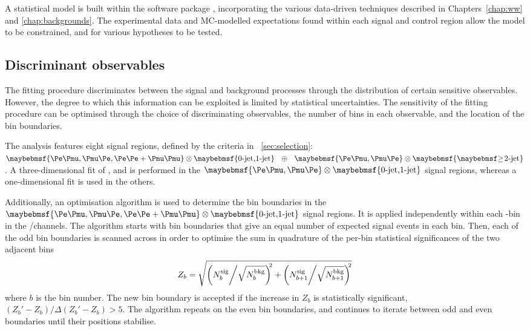
A statistical model is built within the \histfactory software package \cite{HistFactory}, 
incorporating the various data-driven techniques described in Chapters~\ref{chap:ww} and 
\ref{chap:backgrounds}. The experimental data and MC-modelled expectations found within each 
signal and control region allow the model to be constrained, and for various hypotheses to 
be tested.



\subsection{Discriminant observables}
\label{sec:stat:sr_binning}

The fitting procedure discriminates between the signal and background processes through the 
distribution of certain sensitive observables. However, the degree to which this information 
can be exploited is limited by statistical uncertainties. The sensitivity of the fitting 
procedure can be optimised through the choice of discriminating observables, the number of 
bins in each observable, and the location of the bin boundaries.

The analysis features eight signal regions, defined by the criteria in 
\Section~\ref{sec:selection}: $\braces{\emch,\mech,\eech{}+\mmch} \otimes 
\braces{\text{0-jet,1-jet}}~~\oplus~~\braces{\emch,\mech} \otimes \braces{\twojet}$.
A three-dimensional fit of \mt, \ptsubleadlep and \mll is performed in the 
$\braces{\emch,\mech} \otimes \braces{\text{0-jet,1-jet}}$ signal regions, whereas a 
one-dimensional \mt fit is used in the others.

Additionally, an optimisation algorithm is used to determine the \mt bin boundaries in the 
$\braces{\emch,\mech,\eech{}+\mmch} \otimes \braces{\text{0-jet,1-jet}}$ signal regions. 
It is applied independently within each \ptsubleadlep-\mll bin in the \emch/\mech channels. 
The algorithm starts with bin boundaries that give an equal number of expected signal 
events in each bin. Then, each of the odd bin boundaries is scanned across \mt in order to 
optimise the sum in quadrature of the per-bin statistical significances of the two adjacent 
bins
\begin{equation}
	Z_b = \sqrt{\left(N_{b}^{\text{sig}} \middle/ \sqrt{N_{b}^{\text{bkg}}}\right)^{\!\!2} + \left(N_{b+1}^{\text{sig}} \middle/ \sqrt{N_{b+1}^{\text{bkg}}}\right)^{\!\!2}}
\end{equation}
where $b$ is the bin number. The new bin boundary is accepted if the increase in $Z_b$ is 
statistically significant, \ie $(Z_b' - Z_b)/\Delta(Z_b' - Z_b) > 5$. The algorithm repeats 
on the even bin boundaries, and continues to iterate between odd and even boundaries until 
their positions stabilise.

